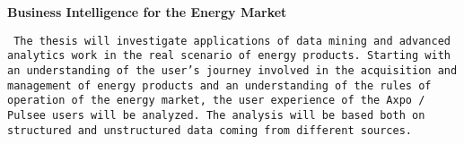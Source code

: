 \textbf{Business Intelligence for the Energy Market}

\texttt{
    The thesis will investigate applications of data mining and advanced analytics work in the real scenario of energy products.
    Starting with an understanding of the user's journey involved in the acquisition and management of energy products and an understanding of the rules of operation of the energy market, the user experience of the Axpo / Pulsee users will be analyzed.
    The analysis will be based both on structured and unstructured data coming from different sources.
}